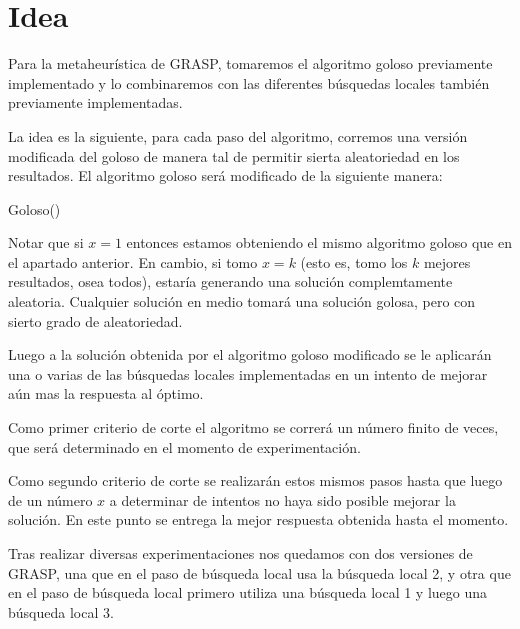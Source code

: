 \section{Idea}


Para la metaheurística de GRASP, tomaremos el algoritmo goloso previamente implementado y lo combinaremos con las diferentes búsquedas locales también previamente implementadas.

La idea es la siguiente, para cada paso del algoritmo, corremos una versión modificada del goloso de manera tal de permitir sierta aleatoriedad en los resultados. El algoritmo goloso será modificado de la siguiente manera:

\begin{algorithm}
  \begin{algorithmic}[1]\parskip=1mm
 \caption{ Goloso()}
\end{algorithmic}
\end{algorithm} 

Notar que si $x=1$ entonces estamos obteniendo el mismo algoritmo goloso que en el apartado anterior. En cambio, si tomo $x = k$ (esto es, tomo los $k$ mejores resultados, osea todos), estaría generando una solución complemtamente aleatoria. Cualquier solución en medio tomará una solución golosa, pero con sierto grado de aleatoriedad.

Luego a la solución obtenida por el algoritmo goloso modificado se le aplicarán una o varias de las búsquedas locales implementadas en un intento de mejorar aún mas la respuesta al óptimo.

Como primer criterio de corte el algoritmo se correrá un número finito de veces, que será determinado en el momento de experimentación.

Como segundo criterio de corte se realizarán estos mismos pasos hasta que luego de un número $x$ a determinar de intentos no haya sido posible mejorar la solución. En este punto se entrega la mejor respuesta obtenida hasta el momento.

Tras realizar diversas experimentaciones nos quedamos con dos versiones de GRASP, una que en el paso de búsqueda local usa la búsqueda local 2, y otra que en el paso de búsqueda local primero utiliza una búsqueda local 1 y luego una búsqueda local 3.

